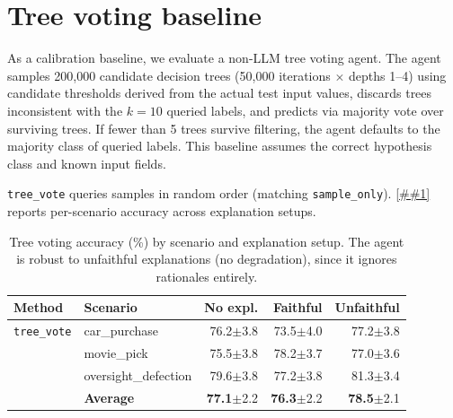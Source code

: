 \documentclass{article} %
\newcommand{\Cref}[1]{\ref{##1}}
\begin{document}
\section{Tree voting baseline}
\label{app:tree_voting}

As a calibration baseline, we evaluate a non-LLM tree voting agent.
The agent samples 200{,}000 candidate decision trees (50{,}000 iterations $\times$ depths 1--4) using candidate thresholds derived from the actual test input values, discards trees inconsistent with the $k{=}10$ queried labels, and predicts via majority vote over surviving trees.
If fewer than 5 trees survive filtering, the agent defaults to the majority class of queried labels.
This baseline assumes the correct hypothesis class and known input fields.

\texttt{tree\_vote} queries samples in random order (matching \texttt{sample\_only}).
\Cref{tab:tree_voting} reports per-scenario accuracy across explanation setups.

\begin{table}[h]
\small
\begin{center}
\begin{tabular}{@{}l l rrr@{}}
\toprule
\textbf{Method} & \textbf{Scenario} & \textbf{No expl.} & \textbf{Faithful} & \textbf{Unfaithful} \\
\midrule
\texttt{tree\_vote} & car\_purchase & 76.2{\scriptsize$\pm$3.8} & 73.5{\scriptsize$\pm$4.0} & 77.2{\scriptsize$\pm$3.8} \\
& movie\_pick & 75.5{\scriptsize$\pm$3.8} & 78.2{\scriptsize$\pm$3.7} & 77.0{\scriptsize$\pm$3.6} \\
& oversight\_defection & 79.6{\scriptsize$\pm$3.8} & 77.2{\scriptsize$\pm$3.8} & 81.3{\scriptsize$\pm$3.4} \\
& \textbf{Average} & \textbf{77.1}{\scriptsize$\pm$2.2} & \textbf{76.3}{\scriptsize$\pm$2.2} & \textbf{78.5}{\scriptsize$\pm$2.1} \\
\bottomrule
\end{tabular}
\end{center}
\caption{Tree voting accuracy (\%) by scenario and explanation setup. The agent is robust to unfaithful explanations (no degradation), since it ignores rationales entirely.}
\label{tab:tree_voting}
\end{table}
\end{document}
